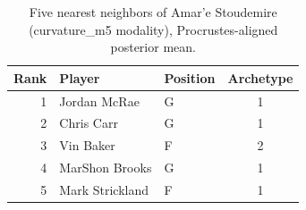 \begin{table}[htbp]
  \centering\small
  \begin{tabular}{rllc}
    \toprule
    Rank & Player & Position & Archetype \\
    \midrule
    1 & Jordan McRae & G & 1 \\
    2 & Chris Carr & G & 1 \\
    3 & Vin Baker & F & 2 \\
    4 & MarShon Brooks & G & 1 \\
    5 & Mark Strickland & F & 1 \\
    \bottomrule
  \end{tabular}
  \caption{Five nearest neighbors of Amar'e Stoudemire (curvature_m5 modality), Procrustes-aligned posterior mean.}
  \label{tab:Amar_e_Stoudemire_neighbors_curvature_m5}
\end{table}

